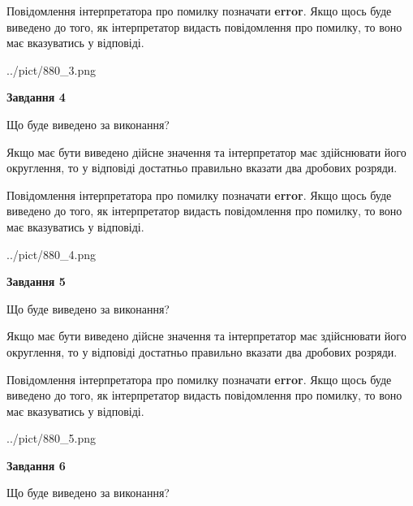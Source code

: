 \documentclass[12pt, ukrainian]{article}
\begin{document}
{\begin {Large}
Повідомлення інтерпретатора про помилку позначати \textbf{error}.
Якщо щось буде виведено до того, як інтерпретатор видасть повідомлення про помилку, 
то воно має вказуватись у відповіді. \par

\begin{center}
	{../pict/880_3.png}
\end{center}
\newpage

{\begin {center}\textbf{Завдання 4}\end {center}}\par
Що буде виведено за виконання? \par

Якщо має бути виведено дійсне значення та інтерпретатор має здійснювати його округлення, 
то у відповіді достатньо правильно вказати два дробових розряди.

Повідомлення інтерпретатора про помилку позначати \textbf{error}.
Якщо щось буде виведено до того, як інтерпретатор видасть повідомлення про помилку, 
то воно має вказуватись у відповіді. \par

\begin{center}
	{../pict/880_4.png}
\end{center}
\newpage

{\begin {center}\textbf{Завдання 5}\end {center}}\par
Що буде виведено за виконання? \par

Якщо має бути виведено дійсне значення та інтерпретатор має здійснювати його округлення, 
то у відповіді достатньо правильно вказати два дробових розряди.

Повідомлення інтерпретатора про помилку позначати \textbf{error}.
Якщо щось буде виведено до того, як інтерпретатор видасть повідомлення про помилку, 
то воно має вказуватись у відповіді. \par

\begin{center}
	{../pict/880_5.png}
\end{center}
\newpage

{\begin {center}\textbf{Завдання 6}\end {center}}\par
Що буде виведено за виконання? \par


\end{Large}}
\end{document}

